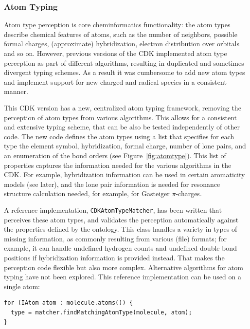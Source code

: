 \documentclass[doublespacing]{bmcart}
\begin{document}
  \subsubsection*{Atom Typing}

  Atom type perception is core cheminformatics functionality: the
  atom types describe chemical features of atoms, such as the number
  of neighbors, possible formal charges, (approximate) hybridization,
  electron distribution over orbitals and so on. However, previous
  versions of the CDK implemented atom type perception as part of
  different algorithms, resulting in duplicated and sometimes
  divergent typing schemes. As a result it was cumbersome to add new
  atom types and implement support for new charged and radical species
  in a consistent manner.
  
  This CDK version has a new, centralized atom typing framework,
  removing the perception of atom types from various algorithms. This
  allows for a consistent and extensive typing scheme, that can be
  also be tested independently of other code.  The new code defines
  the atom types using a list that specifies for each type the element
  symbol, hybridization, formal charge, number of lone pairs, and an
  enumeration of the bond orders (see Figure~\ref{fig:atomtype}). This list of
  properties captures the information needed for the various
  algorithms in the CDK. For example, hybridization information can be
  used in certain aromaticity models (see later), and the lone pair
  information is needed for resonance structure calculation needed,
  for example, for Gasteiger $\pi$-charges.

  A reference implementation, \texttt{CDKAtomTypeMatcher}, has been
  written that perceives these atom types, and validates the
  perception automatically against the properties defined by the
  ontology.  This class handles a variety in types of missing
  information, as commonly resulting from various (file) formats; for
  example, it can handle undefined hydrogen counts and undefined
  double bond positions if hybridization information is provided
  instead.  That makes the perception code flexible but also more
  complex. Alternative algorithms for atom typing have not been
  explored. This reference implementation can be used on a single
  atom:

\vspace{0.2cm}
\begin{verbatim}
for (IAtom atom : molecule.atoms()) {
  type = matcher.findMatchingAtomType(molecule, atom);
}
\end{verbatim}
\vspace{0.2cm}
\end{document}
